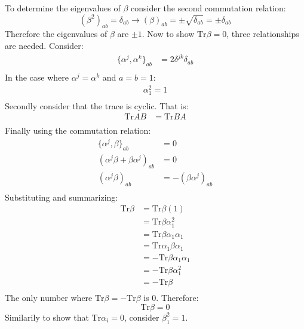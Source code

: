 \documentclass[9pt]{report}
\begin{document}
\begin{enumerate}
  To determine the eigenvalues of $\beta$ consider the second commutation relation:
  \[
    (\beta^2)_{ab} = \delta_{ab} \to (\beta)_{ab} = \pm \sqrt{\delta_{ab}}  = \pm \delta_{ab}
  \]
  Therefore the eigenvalues of $\beta$ are $\pm 1$.
  Now to show $\text{Tr}\beta=0$, three relationships are needed. Consider:
  \[
    \begin{align}
    \{\alpha^j,\alpha^k\}_{ab} &= 2\delta^{jk}\delta_{ab} \\
    \end{align}
  \]
  In the case where $\alpha^j = \alpha^k$ and $a = b = 1$:
  \begin{equation}
    \begin{align}
    \alpha^2_1 = 1\\
    \end{align}
  \end{equation}
  Secondly consider that the trace is cyclic. That is:
  \begin{equation}
    \begin{align}
    \text{Tr}AB &= \text{Tr}BA\\
    \end{align}
  \end{equation}
  Finally using the commutation relation:
  \[
    \begin{align}
      \{\alpha^j, \beta\}_{ab} &= 0\\
      (\alpha^j\beta + \beta\alpha^j)_{ab} &= 0\\
      (\alpha^j\beta)_{ab} &= -(\beta\alpha^j)_{ab}\\
    \end{align}
  \]
  Substituting and summarizing:
  \[
    \begin{align}
      \text{Tr}\beta&= \text{Tr}\beta(1)\\
                    &= \text{Tr}\beta\alpha_1^2\\
                    &= \text{Tr}\beta\alpha_1\alpha_1\\
                    &= \text{Tr}\alpha_1\beta\alpha_1\\
                    &= -\text{Tr}\beta\alpha_1\alpha_1\\
                    &= -\text{Tr}\beta\alpha_1^2\\
                    &= -\text{Tr}\beta\\
    \end{align}
  \]
  The only number where $\text{Tr}\beta = -\text{Tr}\beta$ is $0$. Therefore:
  \[
    \text{Tr}\beta = 0
  \]
  Similarily to show that $\text{Tr}\alpha_i = 0$, consider $\beta^2_1 = 1$.

\end{enumerate}
\end{document}
